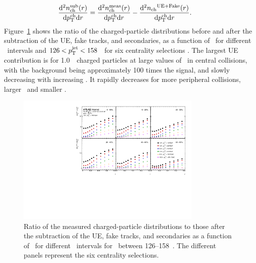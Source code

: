 \begin{align*}
\frac{\mathrm{d}^2 \mbox{$n_{\mathrm{ch}}^{\mathrm{sub}}$} (r) }{ \mathrm{d} \mbox{$p_{\mathrm{T}}^{\mathrm{ch}}$} \mathrm{d} r } &=  \frac{\mathrm{d}^2 \mbox{$n_{\mathrm{ch}}^{\mathrm{meas}}$}  (r) }{ \mathrm{d} \mbox{$p_{\mathrm{T}}^{\mathrm{ch}}$} \mathrm{d} r} -  \frac{ \mathrm{d}^2 \mbox{$n_{\mathrm{ch}}$}^{\mathrm{UE+Fake}}(r)  }{ \mathrm{d} \mbox{$p_{\mathrm{T}}^{\mathrm{ch}}$} \mathrm{d} r}.
\end{align*}
Figure~\ref{fig:UEsize} shows the ratio of the charged-particle distributions before and after the subtraction of the UE, fake tracks, and secondaries,
 as a function of \rvar\ for different \pttrk\ intervals and $126 < \mbox{$p_{\mathrm{T}}^{\mathrm{jet}}$} < 158$ \GeV\ for six centrality selections
. The largest UE contribution is for 1.0~\GeV\ charged particles at large values of \rvar\ in central collisions, with
the background being approximately 100 times the signal, and slowly decreasing with increasing \ptjet. 
It rapidly decreases for more peripheral collisions, larger \pttrk\ and smaller \rvar. 


\begin{figure}
\centerline{
 \includegraphics[width=0.8\textwidth]{figures/performance/UE_B2S_single_0} }
\caption{Ratio of the measured charged-particle distributions to those after the subtraction of the UE, fake tracks, and secondaries as a function of \rvar\ for different \pttrk\ intervals for \ptjet\ between 126--158~\GeV. The different panels represent the six centrality selections.}
\label{fig:UEsize}
\end{figure}


